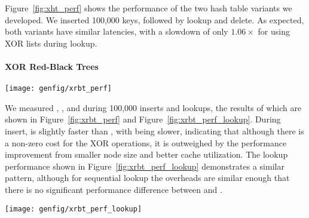 Figure~\ref{fig:xht_perf} shows the performance of the two hash table variants
we developed. We inserted 100,000 keys, followed by lookup and delete.
As expected, both variants have similar latencies, with a slowdown of
only $1.06\times$ for using XOR lists during lookup.




\paragraph{XOR Red-Black Trees}








\begin{SCfigure}
	\centering
	\texttt{[image: genfig/xrbt\_perf]}
	\caption[XOR red-black tree insert latency]{Insert latency for XOR red-black trees compared to normal
		red-black trees. The label ``a'' shows the cost of the XORs, while ``b''
		shows the cost of the larger node.}
	\label{fig:xrbt_perf}
\end{SCfigure}



We measured \xrbt, \xrbtbig, and \rbt during 100,000 inserts and lookups, the results of
which are shown in Figure~\ref{fig:xrbt_perf} and
Figure~\ref{fig:xrbt_perf_lookup}. During insert, \xrbt is slightly
faster than \rbt, with \xrbtbig being slower, indicating that although there is
a non-zero cost for the XOR operations, it is outweighed by the
performance improvement from smaller node size and better cache utilization. The
lookup performance shown in Figure~\ref{fig:xrbt_perf_lookup} demonstrates a
similar pattern, although for sequential lookup the overheads are similar enough
that there is no significant performance difference between \xrbt and \rbt.

\begin{SCfigure}
	\centering
	\texttt{[image: genfig/xrbt\_perf\_lookup]}
	\caption[XOR red-black tree lookup latency]{Lookup latency for XOR red-black trees compared to normal
		red-black trees.}
	\label{fig:xrbt_perf_lookup}
\end{SCfigure}

